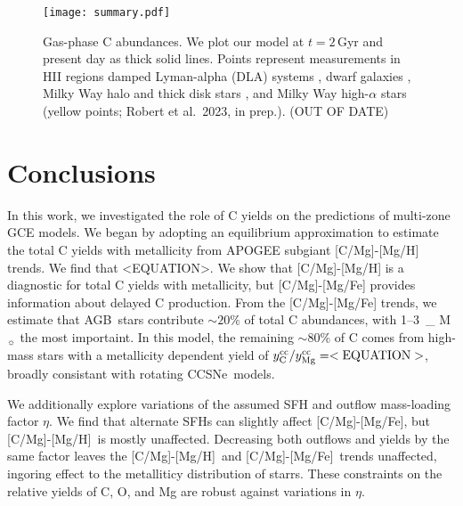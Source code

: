 \documentclass[fleqn,usenatbib]{mnras}
\newcommand{\citealtjack}{Robert et al.~2023, in prep.}
\newcommand{\agb}{AGB}
\newcommand{\apogee}{APOGEE}
\newcommand{\cc}{CCSNe}
\newcommand{\gce}{GCE}
\newcommand{\sfh}{SFH} %
\newcommand{\caah}{[C/Mg]-[Mg/H]}
\newcommand{\caafe}{[C/Mg]-[Mg/Fe]}
\newcommand{\Ycc}{\ensuremath{y_{\rm C}^{\rm cc}}}
\newcommand{\Yoc}{\ensuremath{y_{\rm Mg}^{\rm cc}}}
\newcommand{\Mo}{%
    \ifmmode {\rm M}_{\sun}%
    \else M$_{\sun}$
    \fi}
\newcommand{\about}[1]{${\sim} #1$}
\begin{document}


\begin{figure}
\centering
\texttt{[image: summary.pdf]}
\caption[]{Gas-phase C abundances. We plot our model at $t=2$\,Gyr and present day as thick solid lines. Points represent measurements in 
    HII regions    \citep[pink circles;][]{skillman+20, esteban+02, esteban+09, esteban+14, esteban+19}
    damped Lyman-alpha (DLA) systems \citep[blue triangles;][]{ellison+10, srianand+10, dutta+14, DZ+03, pettini+08, morrison+16,cooke+17},  %
    dwarf galaxies \citep[red diamonds;][]{berg+19},
    Milky Way halo and thick disk stars \citep[green stars;][]{nissen+14, fabbian+09},
    and Milky Way high-$\alpha$ stars (yellow points; \citealtjack).
    (OUT OF DATE)
}
\label{fig:gas_phase}
\end{figure}


\section{Conclusions}

In this work, we investigated the role of C yields on the predictions of multi-zone \gce{} models. 
We began by adopting an equilibrium approximation to estimate the total C yields with metallicity from \apogee{} subgiant \caah{} trends.
We find that <EQUATION>.
We show that \caah{} is a diagnostic for total C yields with metallicity, but \caafe{} provides information about delayed C production. From the \caafe{} trends, we estimate that \agb\ stars contribute \about{20\%} of total C abundances, with 1--3\,\Mo the most importaint. In this model, the remaining \about{80\%} of C comes from high-mass stars with a metallicity dependent yield of $\Ycc/\Yoc=<\text{EQUATION}>$, broadly consistant with rotating \cc\ models.

We additionally explore variations of the assumed \sfh{} and outflow mass-loading factor $\eta$. We find that alternate \sfh{}s can slightly affect \caafe, but \caah~is mostly unaffected. Decreasing both outflows and yields by the same factor leaves the \caah~and \caafe~trends unaffected, ingoring effect to the metalliticy distribution of starrs. These constraints on the relative yields of C, O, and Mg are robust against variations in $\eta$.
\end{document}
